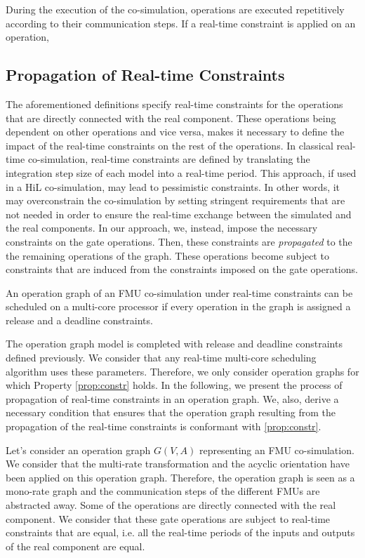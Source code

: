 During the execution of the co-simulation, operations are executed repetitively according to their communication steps. If a real-time constraint is applied on an operation, 

\subsection{Propagation of Real-time Constraints}

The aforementioned definitions specify real-time constraints for the operations that are directly connected with the real component. These operations being dependent on other operations and vice versa, makes it necessary to define the impact of the real-time constraints on the rest of the operations. In classical real-time co-simulation, real-time constraints are defined by translating the integration step size of each model into a real-time period. This approach, if used in a HiL co-simulation, may lead to pessimistic constraints. In other words, it may overconstrain the co-simulation by setting stringent requirements that are not needed in order to ensure the real-time exchange between the simulated and the real components. In our approach, we, instead, impose the necessary constraints on the gate operations. Then, these constraints are \textit{propagated} to the the remaining operations of the graph. These operations become subject to constraints that are induced from the constraints imposed on the gate operations.

\begin{property}
An operation graph of an FMU co-simulation under real-time constraints can be scheduled on a multi-core processor if every operation in the graph is assigned a release and a deadline constraints.
\label{prop:constr}
\end{property}

The operation graph model is completed with release and deadline constraints defined previously. We consider that any real-time multi-core scheduling algorithm uses these parameters. Therefore, we only consider operation graphs for which Property \ref{prop:constr} holds. In the following, we present the process of propagation of real-time constraints in an operation graph. We, also, derive a necessary condition that ensures that the operation graph resulting from the propagation of the real-time constraints is conformant with \ref{prop:constr}.

Let's consider an operation graph $G(V,A)$ representing an FMU co-simulation. We consider that the multi-rate transformation and the acyclic orientation have been applied on this operation graph. Therefore, the operation graph is seen as a mono-rate graph and the communication steps of the different FMUs are abstracted away. Some of the operations are directly connected with the real component. We consider that these gate operations are subject to real-time constraints that are equal, i.e. all the real-time periods of the inputs and outputs of the real component are equal.

